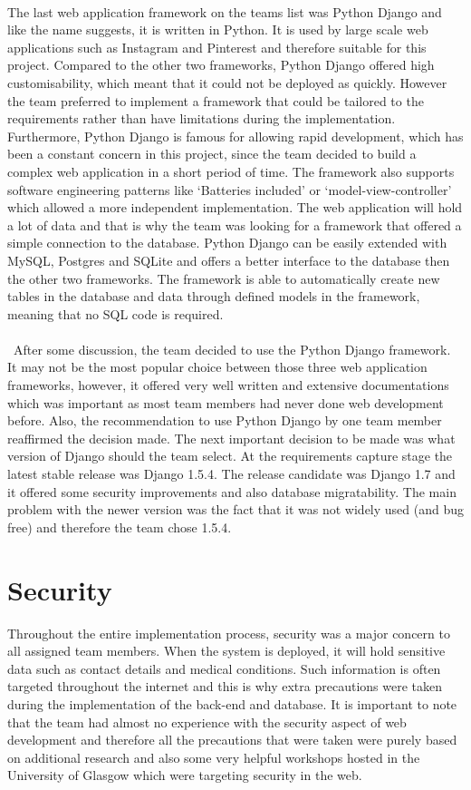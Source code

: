 \documentclass{l3proj}
\begin{document}
\\The last web application framework on the teams list was Python Django and like the name suggests, it is written in Python. It is used by large scale web applications such as Instagram and Pinterest and therefore suitable for this project. Compared to the other two frameworks, Python Django offered high customisability, which meant that it could not be deployed as quickly. However the team preferred to implement a framework that could be tailored to the requirements rather than have limitations during the implementation. Furthermore, Python Django is famous for allowing rapid development, which has been a constant concern in this project, since the team decided to build a complex web application in a short period of time. The framework also supports software engineering patterns like `Batteries included' or `model-view-controller' which allowed a more independent implementation. The web application will hold a lot of data and that is why the team was looking for a framework that offered a simple connection to the database. Python Django can be easily extended with MySQL, Postgres and SQLite and offers a better interface to the database then the other two frameworks. The framework is able to automatically create new tables in the database and data through defined models in the framework, meaning that no SQL code is required.\\
\\\
After some discussion, the team decided to use the Python Django framework. It may not be the most popular choice between those three web application frameworks, however, it offered very well written and extensive documentations which was important as most team members had never done web development before. Also, the recommendation to use Python Django by one team member reaffirmed the decision made. The next important decision to be made was what version of Django should the team select. At the requirements capture stage the latest stable release was Django 1.5.4. The release candidate was Django 1.7 and it offered some security improvements and also database migratability. The main problem with the newer version was the fact that it was not widely used (and bug free) and therefore the team chose 1.5.4.

\section{Security}
Throughout the entire implementation process, security was a major concern to all assigned team members. When the system is deployed, it will hold sensitive data such as contact details and medical conditions. Such information is often targeted throughout the internet and this is why extra precautions were taken during the implementation of the back-end and database. It is important to note that the team had almost no experience with the security aspect of web development and therefore all the precautions that were taken were purely based on additional research and also some very helpful workshops hosted in the University of Glasgow which were targeting security in the web.
\end{document}
